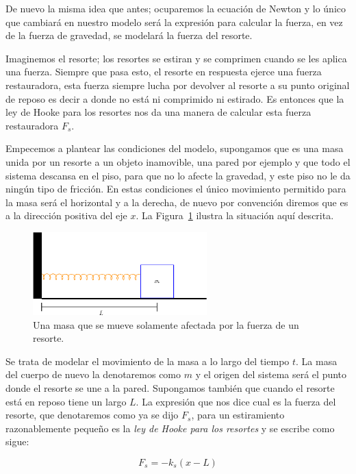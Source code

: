De nuevo la misma idea que antes; ocuparemos la ecuación de Newton y lo único que cambiará en nuestro modelo será la expresión para calcular la fuerza, en vez de la fuerza de gravedad, se modelará la fuerza del resorte.

Imaginemos el resorte; los resortes se estiran y se comprimen cuando se les aplica una fuerza.
Siempre que pasa esto, el resorte en respuesta ejerce una fuerza restauradora, esta fuerza siempre lucha por devolver al resorte a su punto original de reposo es decir a donde no está ni comprimido ni estirado.
Es entonces que la ley de Hooke para los resortes nos da una manera de calcular esta fuerza restauradora $F_s$.

Empecemos a plantear las condiciones del modelo, supongamos que es una masa unida por un resorte a un objeto inamovible, una pared por ejemplo y que todo el sistema descansa en el piso, para que no lo afecte la gravedad, y este piso no le da ningún tipo de fricción.
En estas condiciones el único movimiento permitido para la masa será el horizontal y a la derecha, de nuevo por convención diremos que es a la dirección positiva del eje $x$.
La Figura~\ref{masaResorte:fig} ilustra la situación aquí descrita.

\begin{figure}[htb]
 \centering
 \includegraphics[width=0.6\textwidth]{img/01/masaResorte}
 \caption[Masa unida por un resorte]{ 
 Una masa que se mueve solamente afectada por la fuerza de un resorte.
 } \label{masaResorte:fig}
\end{figure}

Se trata de modelar el movimiento de la masa a lo largo del tiempo $t$.
La masa del cuerpo de nuevo la denotaremos como $m$ y el origen del sistema será el punto donde el resorte se une a la pared.
Supongamos también que cuando el resorte está en reposo tiene un largo $L$.
La expresión que nos dice cual es la fuerza del resorte, que denotaremos como ya se dijo $F_s$, para un estiramiento razonablemente pequeño es la \emph{ley de Hooke para los resortes} y se escribe como sigue:

\begin{equation}
F_s = -k_s \left( x - L \right)
\end{equation}


